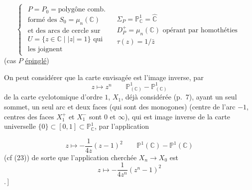 \[
\tag{91}
\left\{
\begin{array}{ll}
\begin{gathered}
P=P_0=\text{polygône comb.}\\
\text{formé des }S_0=\mu_n(\mathbb C)\\
\text{et des arcs de cercle sur}\\
U=\{z\in\mathbb C\mid |z|=1\}\text{ qui}\\
\text{les joignent}
\end{gathered}
&
\begin{gathered}
\Sigma_P=\mathbb P^1_{\mathbb C}=\widehat{\mathbb C}\\
D_P^+=\mu_n(\mathbb C)\text{ opérant par homothéties}\\
\tau(z)=1/\bar z
\end{gathered}
\end{array}
\right.
\]
(cas $P$ \uline{épinglé})

On peut considérer que la carte envisagée  est l'image inverse, par
\[
z\longmapsto z^n
\qquad \mathbb P^1_{(\mathbb C)}\mathbin{-}\mathbb P^1_{(\mathbb C)}
\]
de la carte cyclotomique d'ordre $1$, $X_1$, déjà considérée (p.~7), ayant un seul sommet, un seul arc et deux faces (qui sont des monogones) (centre de l'arc $-1$, centres des faces $X_1^+$ et $X_1^-$ sont $0$ et $\infty$), qui est image inverse de la carte universelle  $\{0\}\subset[0,1]\subset\mathbb P^1_{\mathbb C}$, par l'application


\[
z\longmapsto-\frac1{4z}(z-1)^2
\qquad \mathbb P^1(\mathbb C)\mathbin{-}\mathbb P^1(\mathbb C)
\]
(cf (23)) de sorte que l'application cherchée $X_n\longrightarrow X_0$ est
\[
\tag{92}
z\longmapsto-\frac1{4z^n}(z^n-1)^2
\]
.\,]

